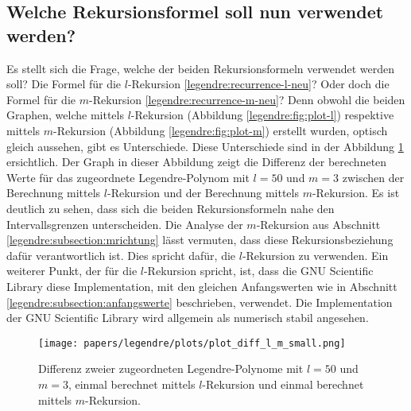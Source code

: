\subsection{Welche Rekursionsformel soll nun verwendet werden?
\label{legendre:subsection:welche}}
Es stellt sich die Frage, welche der beiden Rekursionsformeln verwendet werden soll?
Die Formel für die $l$-Rekursion \eqref{legendre:recurrence-l-neu}?
Oder doch die Formel für die $m$-Rekursion \eqref{legendre:recurrence-m-neu}?
Denn obwohl die beiden Graphen, welche mittels $l$-Rekursion (Abbildung \ref{legendre:fig:plot-l}) respektive mittels $m$-Rekursion (Abbildung \ref{legendre:fig:plot-m}) erstellt wurden, optisch gleich aussehen, gibt es Unterschiede.
Diese Unterschiede sind in der Abbildung \ref{legendre:fig:plot-diff} ersichtlich.
Der Graph in dieser Abbildung zeigt die Differenz der berechneten Werte für das zugeordnete Legendre-Polynom mit $l=50$ und $m=3$ zwischen der Berechnung mittels $l$-Rekursion und der Berechnung mittels $m$-Rekursion.
Es ist deutlich zu sehen, dass sich die beiden Rekursionsformeln nahe den Intervallsgrenzen unterscheiden.
Die Analyse der $m$-Rekursion aus Abschnitt \ref{legendre:subsection:mrichtung} lässt vermuten, dass diese Rekursionsbeziehung dafür verantwortlich ist.
Dies spricht dafür, die $l$-Rekursion zu verwenden.
Ein weiterer Punkt, der für die $l$-Rekursion spricht, ist, dass die GNU Scientific Library \cite{legendre:gsl} diese Implementation, mit den gleichen Anfangswerten wie in Abschnitt \ref{legendre:subsection:anfangswerte} beschrieben, verwendet.
%
Die Implementation der GNU Scientific Library wird allgemein als numerisch stabil angesehen.
\begin{figure}[!ht]
\centering
\texttt{[image: papers/legendre/plots/plot\_diff\_l\_m\_small.png]}
\caption{Differenz zweier zugeordneten Legendre-Polynome mit \texorpdfstring{$l=50$}{l=50} und \texorpdfstring{$m=3$}{m=3}, einmal berechnet mittels \texorpdfstring{$l$}{l}-Rekursion und einmal berechnet mittels \texorpdfstring{$m$}{m}-Rekursion.}
\label{legendre:fig:plot-diff}
\end{figure}
